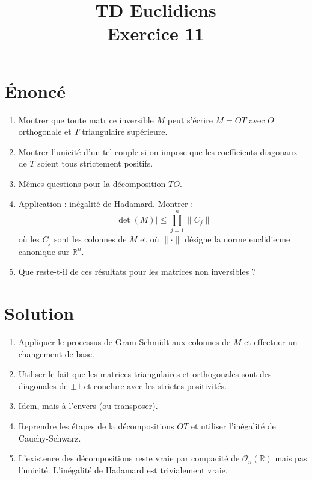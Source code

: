 \documentclass[french]{article}
\title{TD Euclidiens\\ Exercice 11}
\date{}
\newcommand{\R}{\mathbb{R}}
\begin{document}
\maketitle

\section{Énoncé}
\begin{enumerate}
	\item Montrer que toute matrice inversible $M$ peut s'écrire $M=OT$ avec $O$ orthogonale et $T$ triangulaire supérieure.
	\item Montrer l'unicité d'un tel couple si on impose que les coefficients diagonaux de $T$ soient tous strictement positifs.
	\item Mêmes questions pour la décomposition $TO$.
	\item Application : inégalité de Hadamard. Montrer : $$\lvert\det(M)\rvert\leqslant\prod_{j=1}^{n}\lVert C_j\rVert$$ où les $C_j$ sont les colonnes de $M$ et où $\lVert\cdot\rVert$ désigne la norme euclidienne canonique sur $\R^n$.
	\item Que reste-t-il de ces résultats pour les matrices non inversibles ?
\end{enumerate}
\section{Solution}
\begin{enumerate}
	\item Appliquer le processus de Gram-Schmidt aux colonnes de $M$ et effectuer un changement de base.
	\item Utiliser le fait que les matrices triangulaires et orthogonales sont des diagonales de $\pm 1$ et conclure avec les strictes positivités.
	\item Idem, mais à l'envers (ou transposer).
	\item Reprendre les étapes de la décompositions $OT$ et utiliser l'inégalité de Cauchy-Schwarz.
	\item L'existence des décompositions reste vraie par compacité de $\mathcal{O}_n(\R)$ mais pas l'unicité. L'inégalité de Hadamard est trivialement vraie.
\end{enumerate}
\end{document}
